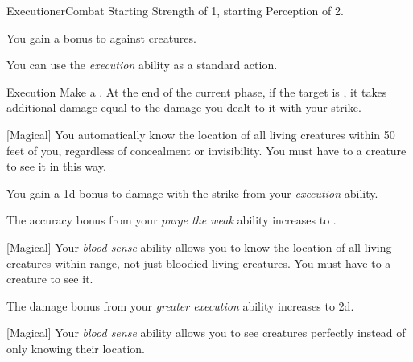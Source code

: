     \begin{feat}{Executioner}{Combat}
        \featpres Starting Strength of 1, starting Perception of 2.

         You gain a  bonus to  against  creatures.

         You can use the \textit{execution} ability as a standard action.
        \begin{apability}{Execution}
            Make a .
            At the end of the current phase, if the target is , it takes additional damage equal to the damage you dealt to it with your strike.
        \end{apability}

        [Magical] You automatically know the location of all  living creatures within 50 feet of you, regardless of concealment or invisibility.
        You must have  to a creature to see it in this way.

         You gain a \plus1d bonus to damage with the strike from your \textit{execution} ability.

         The accuracy bonus from your \textit{purge the weak} ability increases to .

        [Magical] Your \textit{blood sense} ability allows you to know the location of all living creatures within range, not just bloodied living creatures.
        You must have  to a creature to see it.

         The damage bonus from your \textit{greater execution} ability increases to \plus2d.

        [Magical] Your \textit{blood sense} ability allows you to see creatures perfectly instead of only knowing their location.
    \end{feat}

